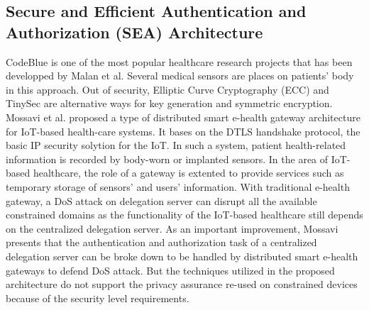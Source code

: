 \subsection{Secure and Efficient Authentication and Authorization (SEA) Architecture}
CodeBlue is one of the most popular healthcare research projects that has been developped by Malan et al.\cite{malan2004codeblue} Several medical sensors are places on patients' body in this approach. Out of security, Elliptic Curve Cryptography (ECC)\cite{koblitz1987elliptic} and TinySec\cite{karlof2004tinysec} are alternative ways for key generation and symmetric encryption. Mossavi et al.\cite{moosavi2015sea} proposed a type of distributed smart e-health gateway architecture for IoT-based health-care systems. It bases on the DTLS handshake protocol, the basic IP security solytion for the IoT. In such a system, patient health-related information is recorded by body-worn or implanted sensors. In the area of IoT-based healthcare, the role of a gateway is extented to provide services such as temporary storage of sensors' and users' information. With traditional e-health gateway, a DoS attack on delegation server can disrupt all the available constrained domains as the functionality of the IoT-based healthcare still depends on the centralized delegation server. As an important improvement, Mossavi presents that the authentication and authorization task of a centralized delegation server can be broke down to be handled by distributed
smart e-health gateways to defend DoS attack. But the techniques utilized in the proposed architecture do not support the privacy assurance re-used on constrained devices because of the security level requirements.

